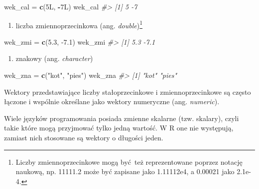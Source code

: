 \documentclass[paper=6in:9in,pagesize=pdftex,headinclude=on,footinclude=on,10pt]{scrbook}
\makeatletter
\newenvironment{Shaded}{\begin{snugshade}}{\end{snugshade}}
\newcommand{\CommentTok}[1]{\textcolor[rgb]{0.56,0.35,0.01}{\textit{#1}}}
\newcommand{\FloatTok}[1]{\textcolor[rgb]{0.00,0.00,0.81}{#1}}
\newcommand{\KeywordTok}[1]{\textcolor[rgb]{0.13,0.29,0.53}{\textbf{#1}}}
\newcommand{\NormalTok}[1]{#1}
\newcommand{\OperatorTok}[1]{\textcolor[rgb]{0.81,0.36,0.00}{\textbf{#1}}}
\newcommand{\StringTok}[1]{\textcolor[rgb]{0.31,0.60,0.02}{#1}}
\providecommand{\tightlist}{%
  \setlength{\itemsep}{0pt}\setlength{\parskip}{0pt}}
\newenvironment{kframe}{%
\medskip{}
\setlength{\fboxsep}{.8em}
 \def\at@end@of@kframe{}%
 \ifinner\ifhmode%
  \def\at@end@of@kframe{\end{minipage}}%
  \begin{minipage}{\columnwidth}%
 \fi\fi%
 \def\FrameCommand##1{\hskip\@totalleftmargin \hskip-\fboxsep
 \colorbox{shadecolor}{##1}\hskip-\fboxsep
     \hskip-\linewidth \hskip-\@totalleftmargin \hskip\columnwidth}%
 \MakeFramed {\advance\hsize-\width
   \@totalleftmargin\z@ \linewidth\hsize
   \@setminipage}}%
 {\par\unskip\endMakeFramed%
 \at@end@of@kframe}
\newenvironment{rmdblock}[1]
  {
  \begin{itemize}
  \renewcommand{\labelitemi}{
    \raisebox{-.7\height}[0pt][0pt]{
      {\setkeys{Gin}{width=3em,keepaspectratio}\texttt{[image: images/\#1]}}
    }
  }
  \setlength{\fboxsep}{1em}
  \begin{kframe}
  \item
  }
  {
  \end{kframe}
  \end{itemize}
  }
\newenvironment{rmdinfo}
  {\begin{rmdblock}{compass}}
  {\end{rmdblock}}
\makeatother
\begin{document}
\begin{Shaded}
\begin{Highlighting}[]
\NormalTok{wek_cal =}\StringTok{ }\KeywordTok{c}\NormalTok{(5L, }\OperatorTok{-}\NormalTok{7L)}
\NormalTok{wek_cal}
\CommentTok{#> [1]  5 -7}
\end{Highlighting}
\end{Shaded}

\begin{enumerate}
\def\labelenumi{\arabic{enumi}.}
\setcounter{enumi}{2}
\tightlist
\item
  liczba zmiennoprzecinkowa (ang. \emph{double})\footnote{Liczby zmiennoprzecinkowe mogą być~też reprezentowane poprzez notację naukową, np. 11111.2 może być zapisane jako 1.11112e4, a 0.00021 jako 2.1e-4.}
\end{enumerate}

\begin{Shaded}
\begin{Highlighting}[]
\NormalTok{wek_zmi =}\StringTok{ }\KeywordTok{c}\NormalTok{(}\FloatTok{5.3}\NormalTok{, }\FloatTok{-7.1}\NormalTok{)}
\NormalTok{wek_zmi}
\CommentTok{#> [1]  5.3 -7.1}
\end{Highlighting}
\end{Shaded}

\begin{enumerate}
\def\labelenumi{\arabic{enumi}.}
\setcounter{enumi}{3}
\tightlist
\item
  znakowy (ang. \emph{character})
\end{enumerate}

\begin{Shaded}
\begin{Highlighting}[]
\NormalTok{wek_zna =}\StringTok{ }\KeywordTok{c}\NormalTok{(}\StringTok{"kot"}\NormalTok{, }\StringTok{"pies"}\NormalTok{)}
\NormalTok{wek_zna}
\CommentTok{#> [1] "kot"  "pies"}
\end{Highlighting}
\end{Shaded}

Wektory przedstawiające liczby stałoprzecinkowe i zmiennoprzecinkowe są często łączone i wspólnie określane jako wektory numeryczne (ang. \emph{numeric}).

\begin{rmdinfo}
Wiele języków programowania posiada zmienne skalarne (tzw. skalary), czyli takie które mogą przyjmować tylko jedną wartość.
W R one nie występują, zamiast nich stosowane są wektory o długości jeden.
\end{rmdinfo}
\end{document}
